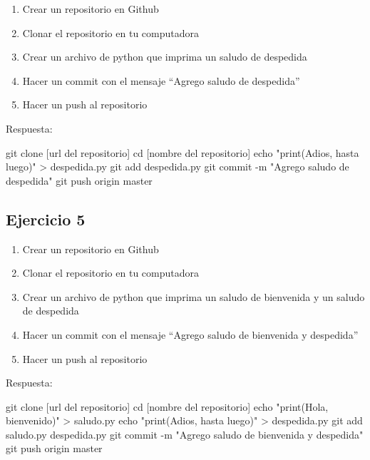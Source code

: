 \documentclass[
  a4paper,
  DIV=11,
  numbers=noendperiod,
  onepage,
  openany]{scrreprt}
\newenvironment{Shaded}{\begin{snugshade}}{\end{snugshade}}
\newcommand{\AttributeTok}[1]{\textcolor[rgb]{0.40,0.45,0.13}{#1}}
\newcommand{\BuiltInTok}[1]{\textcolor[rgb]{0.00,0.23,0.31}{#1}}
\newcommand{\FunctionTok}[1]{\textcolor[rgb]{0.28,0.35,0.67}{#1}}
\newcommand{\NormalTok}[1]{\textcolor[rgb]{0.00,0.23,0.31}{#1}}
\newcommand{\OperatorTok}[1]{\textcolor[rgb]{0.37,0.37,0.37}{#1}}
\newcommand{\StringTok}[1]{\textcolor[rgb]{0.13,0.47,0.30}{#1}}
\providecommand{\tightlist}{%
  \setlength{\itemsep}{0pt}\setlength{\parskip}{0pt}}\usepackage{longtable,booktabs,array}
\begin{document}
\begin{enumerate}
\def\labelenumi{\arabic{enumi}.}
\tightlist
\item
  Crear un repositorio en Github
\item
  Clonar el repositorio en tu computadora
\item
  Crear un archivo de python que imprima un saludo de despedida
\item
  Hacer un commit con el mensaje ``Agrego saludo de despedida''
\item
  Hacer un push al repositorio
\end{enumerate}

Respuesta:

\begin{Shaded}
\begin{Highlighting}[]
\FunctionTok{git}\NormalTok{ clone [url del repositorio]}
\BuiltInTok{cd}\NormalTok{ [nombre del repositorio]}
\BuiltInTok{echo} \StringTok{"print(\textquotesingle{}Adios, hasta luego\textquotesingle{})"} \OperatorTok{\textgreater{}}\NormalTok{ despedida.py}
\FunctionTok{git}\NormalTok{ add despedida.py}
\FunctionTok{git}\NormalTok{ commit }\AttributeTok{{-}m} \StringTok{"Agrego saludo de despedida"}
\FunctionTok{git}\NormalTok{ push origin master}
\end{Highlighting}
\end{Shaded}

\subsection{Ejercicio 5}\label{ejercicio-5}

\begin{enumerate}
\def\labelenumi{\arabic{enumi}.}
\tightlist
\item
  Crear un repositorio en Github
\item
  Clonar el repositorio en tu computadora
\item
  Crear un archivo de python que imprima un saludo de bienvenida y un
  saludo de despedida
\item
  Hacer un commit con el mensaje ``Agrego saludo de bienvenida y
  despedida''
\item
  Hacer un push al repositorio
\end{enumerate}

Respuesta:

\begin{Shaded}
\begin{Highlighting}[]
\FunctionTok{git}\NormalTok{ clone [url del repositorio]}
\BuiltInTok{cd}\NormalTok{ [nombre del repositorio]}
\BuiltInTok{echo} \StringTok{"print(\textquotesingle{}Hola, bienvenido\textquotesingle{})"} \OperatorTok{\textgreater{}}\NormalTok{ saludo.py}
\BuiltInTok{echo} \StringTok{"print(\textquotesingle{}Adios, hasta luego\textquotesingle{})"} \OperatorTok{\textgreater{}}\NormalTok{ despedida.py}
\FunctionTok{git}\NormalTok{ add saludo.py despedida.py}
\FunctionTok{git}\NormalTok{ commit }\AttributeTok{{-}m} \StringTok{"Agrego saludo de bienvenida y despedida"}
\FunctionTok{git}\NormalTok{ push origin master}
\end{Highlighting}
\end{Shaded}
\end{document}
